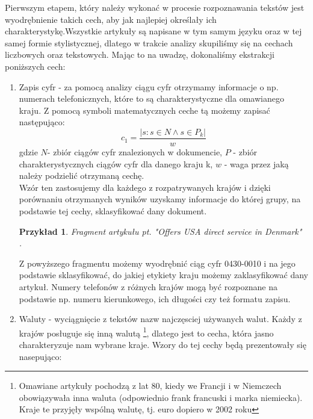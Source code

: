 \documentclass{classrep}
\newtheorem{exmp}{Przykład}[section]
\begin{document}
Pierwszym etapem, który należy wykonać w procesie rozpoznawania tekstów jest wyodrębnienie takich cech, 
aby jak najlepiej określały ich charakterystykę.Wszystkie artykuły są napisane w tym samym języku oraz w tej samej formie stylistycznej, 
dlatego w trakcie analizy skupiliśmy się na cechach liczbowych oraz tekstowych. Mając to na uwadzę, dokonaliśmy ekstrakcji poniższych cech:
\begin{enumerate}
    \item Zapis cyfr - za pomocą analizy ciągu cyfr otrzymamy informacje o np. numerach telefonicznych, które to są charakterystyczne dla omawianego kraju. Z pomocą symboli matematycznych ceche tą możemy zapisać następująco:  
    \begin{equation}
        c_1 = \frac{|{s: s \in N \land s \in P_k}|}{w}
    \end{equation}
    gdzie $N$- zbiór ciągów cyfr znalezionych w dokumencie, $P$ - zbiór charakterystycznych ciągów cyfr dla danego kraju k, $w$ - waga przez jaką należy podzielić otrzymaną cechę.\\
    Wzór ten zastosujemy dla każdego z rozpatrywanych krajów i dzięki porównaniu otrzymanych wyników uzyskamy informacje do której grupy, na podstawie tej cechy, sklasyfikować dany dokument. \\
    \begin{exmp}Fragment artykułu pt. "Offers USA direct service in Denmark" \cite{reuters}\\
    . \\
    \end{exmp}
Z powyższego fragmentu możemy wyodrębnić ciąg cyfr 0430-0010 i na jego podstawie sklasyfikować, do jakiej etykiety kraju możemy zaklasyfikować dany artykuł. Numery telefonów z różnych krajów mogą być rozpoznane na podstawie np. numeru kierunkowego, ich długości czy też formatu zapisu. \\
    \item Waluty - wyciągnięcie z tekstów nazw najczęsciej używanych walut. Każdy z krajów posługuje się inną walutą \footnote{Omawiane artykuły pochodzą z lat 80, kiedy we Francji i w Niemczech obowiązywała inna waluta (odpowiednio frank francuski i marka niemiecka). Kraje te przyjęły wspólną walutę, tj. euro dopiero w 2002 roku}, dlatego jest to cecha, która jasno charakteryzuje nam wybrane kraje. Wzory do tej cechy będą prezentowały się nasepująco:

\end{enumerate}
\end{document}
